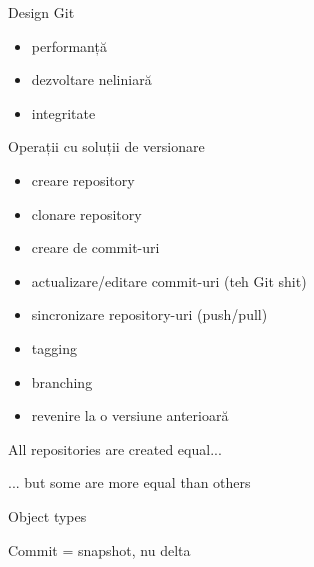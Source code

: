 \documentclass{beamer}
\begin{document}
\begin{frame}{Design Git}
  \begin{itemize}
    \item performanță
    \item dezvoltare neliniară
    \item integritate
  \end{itemize}
\end{frame}

\begin{frame}{Operații cu soluții de versionare}
  \begin{itemize}
    \item creare repository
    \item clonare repository
    \item creare de commit-uri
    \item actualizare/editare commit-uri (teh Git shit)
    \item sincronizare repository-uri (push/pull)
    \item tagging
    \item branching
    \item revenire la o versiune anterioară
  \end{itemize}
\end{frame}

\begin{frame}{All repositories are created equal...}
  \begin{center}
  \end{center}
\end{frame}

\begin{frame}{... but some are more equal than others}
  \begin{center}
  \end{center}
\end{frame}

\begin{frame}{Object types}
  \begin{center}
  \end{center}
\end{frame}

\begin{frame}{Commit = snapshot, nu delta}
  \begin{center}
  \end{center}
\end{frame}
\end{document}
